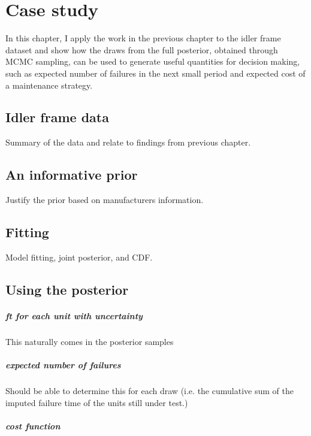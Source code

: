 \chapter{Case study}\label{chap:chapter3}

In this chapter, I apply the work in the previous chapter to the idler frame dataset and show how the draws from the full posterior, obtained through MCMC sampling, can be used to generate useful quantities for decision making, such as expected number of failures in the next small period and expected cost of a maintenance strategy.

\section{Idler frame data}

Summary of the data and relate to findings from previous chapter.

\section{An informative prior}

Justify the prior based on manufacturers information.

\section{Fitting}

Model fitting, joint posterior, and CDF.

\section{Using the posterior}

\paragraph*{ft for each unit with uncertainty}

This naturally comes in the posterior samples

\paragraph*{expected number of failures}

Should be able to determine this for each draw (i.e. the cumulative sum of the imputed failure time of the units still under test.)

\paragraph*{cost function}

